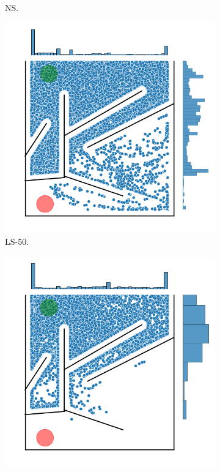 \begin{figure}[H]
\begin{mdframed}
\begin{subfigure}[b]{0.5\textwidth}
            \caption{NS.}
        \end{subfigure}
        \begin{subfigure}[b]{0.5\textwidth}
            \includegraphics[scale=0.4]{resources/mazes/fitness_novelty_open_all_runs.png}
            \caption{LS-50.}
        \end{subfigure}
        \begin{subfigure}[b]{0.5\textwidth}
            \includegraphics[scale=0.4]{resources/mazes/dynamic_open_all_runs.png}

\end{subfigure}
\end{mdframed}
\end{figure}

